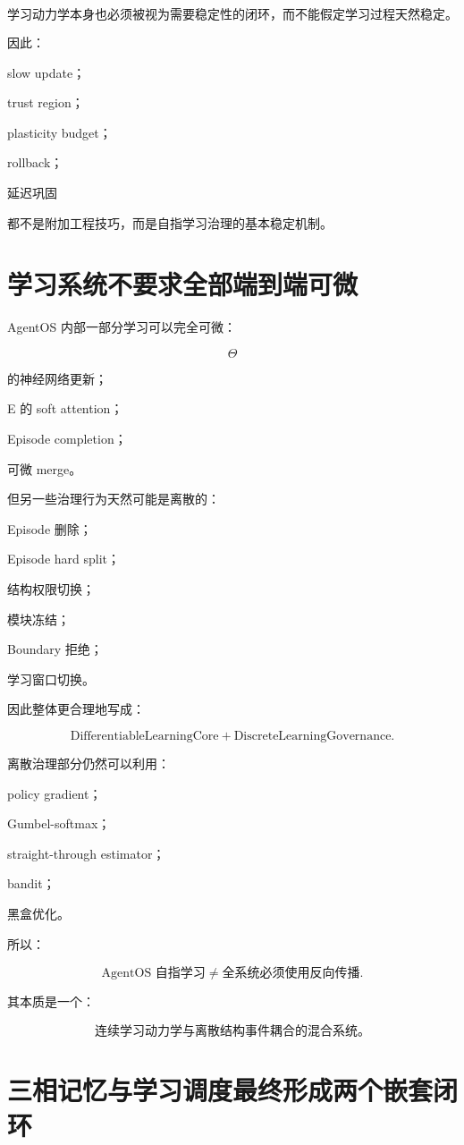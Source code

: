\[
\boxed{
\textbf{
学习动力学本身也必须被视为需要稳定性的闭环，而不能假定学习过程天然稳定。
}
}
\]

因此：

slow update；

trust region；

plasticity budget；

rollback；

延迟巩固

都不是附加工程技巧，而是自指学习治理的基本稳定机制。


\section{学习系统不要求全部端到端可微}

AgentOS 内部一部分学习可以完全可微：

\[
\Theta
\]

的神经网络更新；

E 的 soft attention；

Episode completion；

可微 merge。

但另一些治理行为天然可能是离散的：

Episode 删除；

Episode hard split；

结构权限切换；

模块冻结；

Boundary 拒绝；

学习窗口切换。

因此整体更合理地写成：

\[
\boxed{
\text{DifferentiableLearningCore}
+
\text{DiscreteLearningGovernance}.
}
\]

离散治理部分仍然可以利用：

policy gradient；

Gumbel-softmax；

straight-through estimator；

bandit；

黑盒优化。

所以：

\[
\boxed{
\text{AgentOS 自指学习}
\neq
\text{全系统必须使用反向传播}.
}
\]

其本质是一个：

\[
\boxed{
\textbf{连续学习动力学与离散结构事件耦合的混合系统。}
}
\]


\section{三相记忆与学习调度最终形成两个嵌套闭环}

